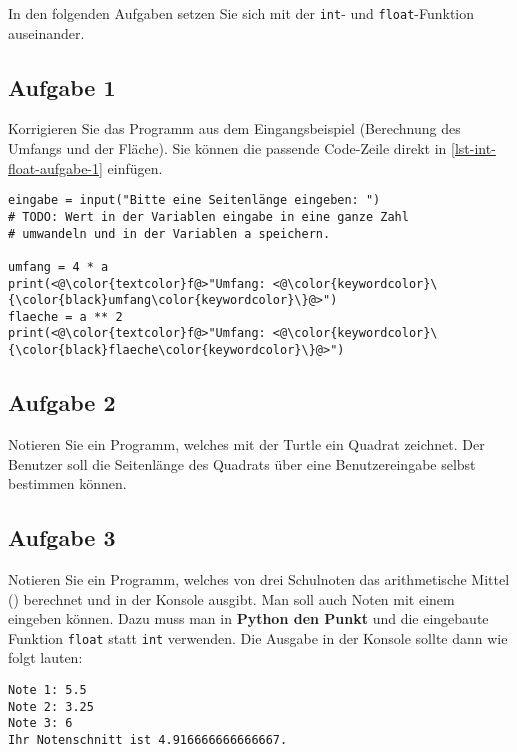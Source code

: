 In den folgenden Aufgaben setzen Sie sich mit der \lstinline{int}- und \lstinline{float}-Funktion auseinander.

\subsection{Aufgabe 1}

Korrigieren Sie das Programm aus dem Eingangsbeispiel (Berechnung des Umfangs und der Fläche). Sie können die passende Code-Zeile direkt in \autoref{lst-int-float-aufgabe-1} einfügen.

\begin{lstlisting}[language=python3, caption={Geometrische Berechnungen am Quadrat.}, label=lst-int-float-aufgabe-1]
eingabe = input("Bitte eine Seitenlänge eingeben: ")
# TODO: Wert in der Variablen eingabe in eine ganze Zahl
# umwandeln und in der Variablen a speichern.

umfang = 4 * a
print(<@\color{textcolor}f@>"Umfang: <@\color{keywordcolor}\{\color{black}umfang\color{keywordcolor}\}@>")
flaeche = a ** 2
print(<@\color{textcolor}f@>"Umfang: <@\color{keywordcolor}\{\color{black}flaeche\color{keywordcolor}\}@>")
\end{lstlisting}

\subsection{Aufgabe 2}

Notieren Sie ein Programm, welches mit der Turtle ein Quadrat zeichnet. Der Benutzer soll die Seitenlänge des Quadrats über eine Benutzereingabe selbst bestimmen können.


\newpage

\subsection{Aufgabe 3}

Notieren Sie ein Programm, welches von drei Schulnoten das arithmetische Mittel () berechnet und in der Konsole ausgibt. Man soll auch Noten mit einem  eingeben können. Dazu muss man in \textbf{Python den Punkt} und die eingebaute Funktion \lstinline{float} statt \lstinline{int} verwenden. Die Ausgabe in der Konsole sollte dann wie folgt lauten:

\begin{lstlisting}[language=output]
Note 1: 5.5
Note 2: 3.25
Note 3: 6
Ihr Notenschnitt ist 4.916666666666667.
\end{lstlisting}

